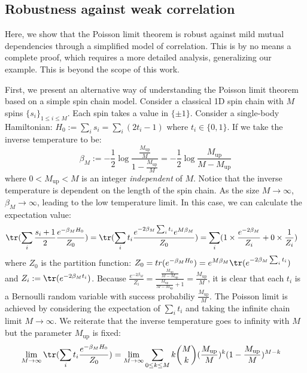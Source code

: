 \documentclass[a4paper,11pt]{article}
\theoremstyle{definition}
\numberwithin{equation}{section}
\begin{document}
\subsection{Robustness against weak correlation}
Here, we show that the Poisson limit theorem is robust against mild mutual dependencies through a simplified model of correlation. This is by no means a complete proof, which requires a more detailed analysis, generalizing our example. This is beyond the scope of this work.

First, we present an alternative way of understanding the Poisson limit theorem based on a simple spin chain model. Consider a classical 1D spin chain with $M$ spins $\{s_i\}_{1\leq i\leq M}$. Each spin takes a value in $\{\pm 1\}$. Consider a single-body Hamiltonian: $H_0 := \sum_i s_i = \sum_i (2t_i - 1)$ where $t_i\in\{0,1\}$. If we take the inverse temperature to be:
\begin{equation}
    \beta_M := -\frac{1}{2}\log\frac{\frac{M_\text{up}}{M}}{1 - \frac{M_\text{up}}{M}} = -\frac{1}{2}\log\frac{M_\text{up}}{M - M_\text{up}}
\end{equation}
where $0 < M_\text{up} < M$ is an integer \textit{independent} of $M$. Notice that the inverse temperature is dependent on the length of the spin chain. As the size $M\rightarrow\infty$, $\beta_M\rightarrow\infty$, leading to the low temperature limit. In this case, we can calculate the expectation value:
\begin{align}
    \begin{split}
        \tr(\sum_i\frac{s_i + 1}{2}\frac{e^{-\beta_M H_0}}{Z_0}) &= \tr(\sum_i t_i \frac{e^{-2\beta_M \sum_i t_i}e^{M\beta_M}}{Z_0}) = \sum_i (1\times\frac{e^{-2\beta_M}}{Z_i} + 0\times\frac{1}{Z_i})
    \end{split}
\end{align}
where $Z_0$ is the partition function: $Z_0 = tr(e^{-\beta_M H_0}) = e^{M\beta_M}\tr(e^{-2\beta_M\sum_it_i})$ and $Z_i := \tr(e^{-2\beta_M t_i})$. Because $\frac{e^{-2\beta_M}}{Z_i} = \frac{\frac{M_\text{up}}{M - M_\text{up}}}{\frac{M_\text{up}}{M - M_\text{up}} + 1} = \frac{M_\text{up}}{M}$, it is clear that each $t_i$ is a Bernoulli random variable with success probabiliy $\frac{M_\text{up}}{M}$. The Poisson limit is achieved by considering the expectation of $\sum_it_i$ and taking the infinite chain limit $M\rightarrow\infty$. We reiterate that the inverse temperature goes to infinity with $M$ but the parameter $M_\text{up}$ is fixed:
\begin{align}
    \begin{split}
        \lim_{M\rightarrow\infty}\tr(\sum_it_i \frac{e^{-\beta_M H_0}}{Z_0}) &= \lim_{M\rightarrow\infty}\sum_{0\leq k\leq M}k\binom{M}{k}(\frac{M_\text{up}}{M})^k(1 - \frac{M_\text{up}}{M})^{M - k}
    \end{split}
\end{align}
\end{document}

